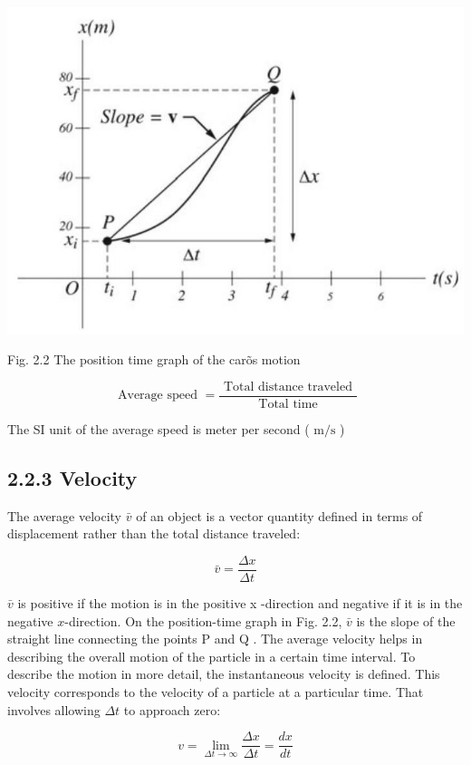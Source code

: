 \documentclass[10pt]{article}
\begin{document}
\begin{center}
\includegraphics[max width=\textwidth]{2024_09_13_db1f357d2aad0a03eb2eg-028(2)}
\end{center}

Fig. 2.2 The position time graph of the carõs motion

$$
\text { Average speed }=\frac{\text { Total distance traveled }}{\text { Total time }}
$$

The SI unit of the average speed is meter per second ( $\mathrm{m} / \mathrm{s}$ )

\subsection*{2.2.3 Velocity}
The average velocity $\bar{v}$ of an object is a vector quantity defined in terms of displacement rather than the total distance traveled:

$$
\bar{v}=\frac{\Delta x}{\Delta t}
$$

$\bar{v}$ is positive if the motion is in the positive x -direction and negative if it is in the negative $x$-direction. On the position-time graph in Fig. 2.2, $\bar{v}$ is the slope of the straight line connecting the points P and Q . The average velocity helps in describing the overall motion of the particle in a certain time interval. To describe the motion in more detail, the instantaneous velocity is defined. This velocity corresponds to the velocity of a particle at a particular time. That involves allowing $\Delta t$ to approach zero:

$$
v=\lim _{\Delta t \rightarrow \infty} \frac{\Delta x}{\Delta t}=\frac{d x}{d t}
$$
\end{document}
